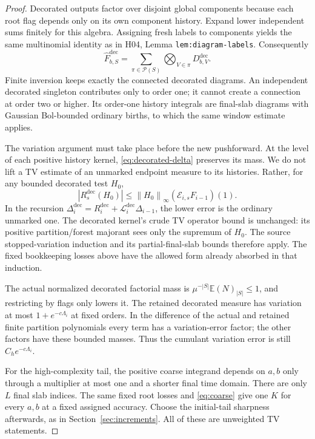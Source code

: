 \documentclass[11pt]{article}
\newcommand{\E}{\mathbb E}
\newcommand{\calP}{\mathcal P}
\newcommand{\norm}[1]{\left\|#1\right\|}
\theoremstyle{definition}\newtheorem{definition}[theorem]{Definition}
\theoremstyle{remark}\newtheorem{remark}[theorem]{Remark}
\numberwithin{equation}{section}
\begin{document}
\begin{proof}
Decorated outputs factor over disjoint global components because each root
flag depends only on its own component history. Expand lower independent
sums finitely for this algebra. Assigning fresh labels to components yields
the same multinomial identity as in H04, Lemma
\texttt{lem:diagram-labels}. Consequently
\begin{equation}\label{eq:decorated-partition}
 \widehat F_{b,S}^{\mathrm{dec}}
       =\sum_{\pi\in\calP(S)}\bigotimes_{V\in\pi}D_{b,V}^{\mathrm{dec}}.
\end{equation}
Finite inversion keeps exactly the connected decorated diagrams. An
independent decorated singleton contributes only to order one; it cannot
create a connection at order two or higher. Its order-one history integrals
are final-slab diagrams with Gaussian Bol-bounded ordinary births, to which
the same window estimate applies.

The variation argument must take place before the new pushforward.
At the level of each positive history kernel, \eqref{eq:decorated-delta}
preserves its mass. We do not lift a TV estimate of an unmarked endpoint
measure to its histories. Rather, for any bounded decorated test $H_0$,
\[
 |R_s^{\mathrm{dec}}(H_0)|
       \le\norm{H_0}_\infty(\mathcal E_{i,s}F_{i-1})(1).
\]
In the recursion
$\Delta_i^{\mathrm{dec}}=R_i^{\mathrm{dec}}+
\mathcal L_i^{\mathrm{dec}}\Delta_{i-1}$, the lower error is the ordinary
unmarked one. The decorated kernel's crude TV operator bound is unchanged:
its positive partition/forest majorant sees only the supremum of $H_0$.
The source stopped-variation induction and its partial-final-slab bounds
therefore apply. The fixed bookkeeping losses above have the allowed form
already absorbed in that induction.

The actual normalized decorated factorial mass is
$\mu^{-|S|}\E(N)_{|S|}\le1$, and restricting by flags only lowers it.
The retained decorated measure has variation at most
$1+e^{-c\Lambda_i}$ at fixed orders. In the difference of the actual and
retained finite partition polynomials every term has a variation-error
factor; the other factors have these bounded masses. Thus the cumulant
variation error is still $C_he^{-c\Lambda_i}$.

For the high-complexity tail, the positive coarse integrand depends on
$a,b$ only through a multiplier at most one and a shorter final time domain.
There are only $L$ final slab indices. The same fixed root losses and
\eqref{eq:coarse} give one $K$ for every $a,b$ at a fixed assigned accuracy.
Choose the initial-tail sharpness afterwards, as in
Section~\ref{sec:increments}. All of these are unweighted TV statements.


\end{proof}
\end{document}
